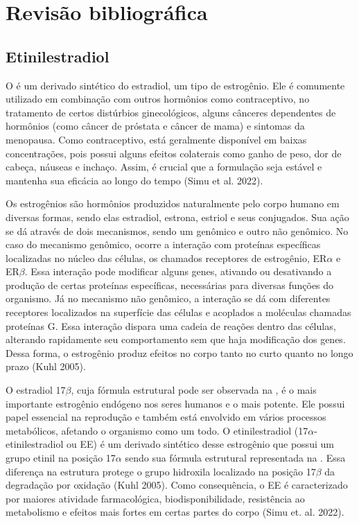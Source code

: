 \chapter{Revisão bibliográfica}\label{chp:revisao}
\section{Etinilestradiol}

O  é um derivado sintético do estradiol, um tipo de estrogênio. Ele é comumente utilizado em combinação com outros hormônios como contraceptivo, no tratamento de certos distúrbios ginecológicos, alguns cânceres dependentes de hormônios (como câncer de próstata e câncer de mama) e sintomas da menopausa. Como contraceptivo, está geralmente disponível em baixas concentrações, pois possui alguns efeitos colaterais como ganho de peso, dor de cabeça, náuseas e inchaço. Assim, é crucial que a formulação seja estável e mantenha sua eficácia ao longo do tempo (Simu et al. 2022).

Os estrogênios são hormônios produzidos naturalmente pelo corpo humano em diversas formas, sendo elas estradiol, estrona, estriol e seus conjugados. Sua ação se dá através de dois mecanismos, sendo um genômico e outro não genômico. No caso do mecanismo genômico, ocorre a interação com proteínas específicas localizadas no núcleo das células, os chamados receptores de estrogênio, ER$\alpha$ e ER$\beta$. Essa interação pode modificar alguns genes, ativando ou desativando a produção de certas proteínas específicas, necessárias para diversas funções do organismo. Já no mecanismo não genômico, a interação se dá com diferentes receptores localizados na superfície das células e acoplados a moléculas chamadas proteínas G. Essa interação dispara uma cadeia de reações dentro das células, alterando rapidamente seu comportamento sem que haja modificação dos genes. Dessa forma, o estrogênio produz efeitos no corpo tanto no curto quanto no longo prazo (Kuhl 2005).

O estradiol 17$\beta$, cuja fórmula estrutural pode ser observada na  , é o mais importante estrogênio endógeno nos seres humanos e o mais potente. Ele possui papel essencial na reprodução e também está envolvido em vários processos metabólicos, afetando o organismo como um todo. O etinilestradiol (17$\alpha$-etinilestradiol ou EE) é um derivado sintético desse estrogênio que possui um grupo etinil na posição 17$\alpha$ sendo sua fórmula estrutural representada na  . Essa diferença na estrutura protege o grupo hidroxila localizado na posição 17$\beta$ da degradação por oxidação (Kuhl 2005). Como consequência, o EE é caracterizado por maiores atividade farmacológica, biodisponibilidade, resistência ao metabolismo e efeitos mais fortes em certas partes do corpo (Simu et. al. 2022).

